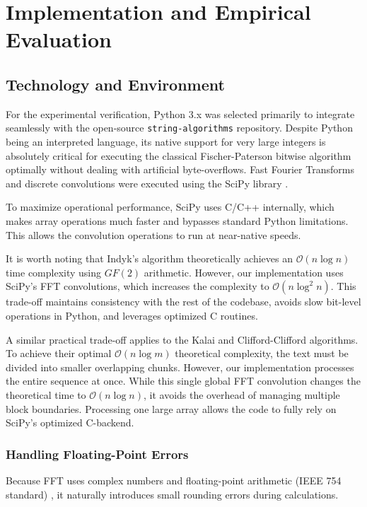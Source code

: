 \chapter{Implementation and Empirical Evaluation}

\section{Technology and Environment}
For the experimental verification, Python 3.x \cite{python3} was selected primarily to integrate seamlessly with the open-source \texttt{string-algorithms} repository. Despite Python being an interpreted language, its native support for very large integers is absolutely critical for executing the classical Fischer-Paterson bitwise algorithm optimally without dealing with artificial byte-overflows. Fast Fourier Transforms and discrete convolutions were executed using the SciPy library \cite{scipy2020}. 

To maximize operational performance, SciPy uses C/C++ internally, which makes array operations much faster and bypasses standard Python limitations. This allows the convolution operations to run at near-native speeds.

It is worth noting that Indyk's algorithm \cite{indyk1998} theoretically achieves an $\mathcal{O}(n \log n)$ time complexity using $GF(2)$ arithmetic. However, our implementation uses SciPy's FFT convolutions, which increases the complexity to $\mathcal{O}(n \log^2 n)$. This trade-off maintains consistency with the rest of the codebase, avoids slow bit-level operations in Python, and leverages optimized C routines.

A similar practical trade-off applies to the Kalai and Clifford-Clifford algorithms. To achieve their optimal $\mathcal{O}(n \log m)$ theoretical complexity, the text must be divided into smaller overlapping chunks. However, our implementation processes the entire sequence at once. While this single global FFT convolution changes the theoretical time to $\mathcal{O}(n \log n)$, it avoids the overhead of managing multiple block boundaries. Processing one large array allows the code to fully rely on SciPy's optimized C-backend.

\subsection{Handling Floating-Point Errors}
Because FFT uses complex numbers and floating-point arithmetic (IEEE 754 standard) \cite{chapra2015}, it naturally introduces small rounding errors during calculations.

